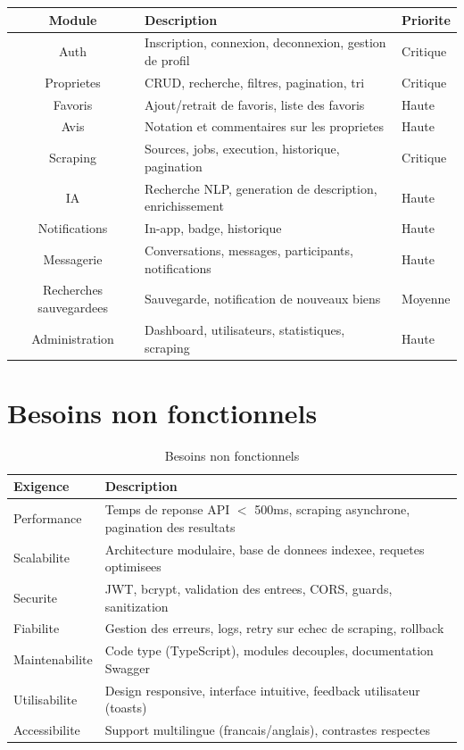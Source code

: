 \documentclass[12pt,a4paper]{report}
\begin{document}
\begin{longtable}{|c|p{8cm}|p{3cm}|}
\hline
\textbf{Module} & \textbf{Description} & \textbf{Priorite} \\
\hline
Auth & Inscription, connexion, deconnexion, gestion de profil & Critique \\
\hline
Proprietes & CRUD, recherche, filtres, pagination, tri & Critique \\
\hline
Favoris & Ajout/retrait de favoris, liste des favoris & Haute \\
\hline
Avis & Notation et commentaires sur les proprietes & Haute \\
\hline
Scraping & Sources, jobs, execution, historique, pagination & Critique \\
\hline
IA & Recherche NLP, generation de description, enrichissement & Haute \\
\hline
Notifications & In-app, badge, historique & Haute \\
\hline
Messagerie & Conversations, messages, participants, notifications & Haute \\
\hline
Recherches sauvegardees & Sauvegarde, notification de nouveaux biens & Moyenne \\
\hline
Administration & Dashboard, utilisateurs, statistiques, scraping & Haute \\
\hline
\end{longtable}

\section{Besoins non fonctionnels}

\begin{table}[H]
\centering
\begin{tabular}{|p{3.5cm}|p{11cm}|}
\hline
\textbf{Exigence} & \textbf{Description} \\
\hline
Performance & Temps de reponse API $<$ 500ms, scraping asynchrone, pagination des resultats \\
\hline
Scalabilite & Architecture modulaire, base de donnees indexee, requetes optimisees \\
\hline
Securite & JWT, bcrypt, validation des entrees, CORS, guards, sanitization \\
\hline
Fiabilite & Gestion des erreurs, logs, retry sur echec de scraping, rollback \\
\hline
Maintenabilite & Code type (TypeScript), modules decouples, documentation Swagger \\
\hline
Utilisabilite & Design responsive, interface intuitive, feedback utilisateur (toasts) \\
\hline
Accessibilite & Support multilingue (francais/anglais), contrastes respectes \\
\hline
\end{tabular}
\caption{Besoins non fonctionnels}
\end{table}
\end{document}
